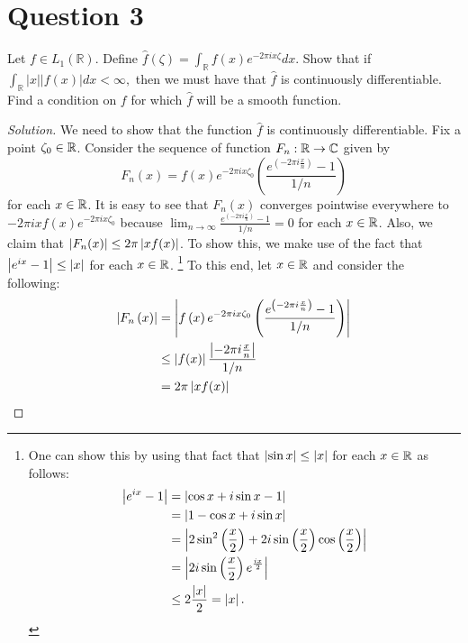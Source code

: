 \section{Question 3}
\horz
Let $f\in L_1(\mathbb R).$ Define $\hat{f}(\zeta)=\int_{\mathbb R}f(x)e^{-2\pi ix\zeta}dx.$ Show that if $\int_{\mathbb{R}}|x||f(x)|dx<\infty,$ then we must have that $\hat{f}$ is continuously differentiable. Find a condition on $f$ for which $\hat{f}$ will be a smooth function.
\horz
\begin{proof}[Solution]
We need to show that the function $\hat{f}$ is continuously differentiable. Fix a point $\zeta_{0} \in \mathbb R$. Consider the sequence of function $F_n : \mathbb R \to \mathbb C$ given by
\begin{equation*}
F_{n} \left( x \right) = f\left( x \right)e^{-2\pi i x \zeta_{0}}\left( \frac{e^{\left( -2\pi i \frac{x}{n} \right)} - 1}{1/n} \right)
\end{equation*}
for each $x \in \mathbb R$.
It is easy to see that $F_{n} \left( x \right)$ converges pointwise everywhere to $-2\pi i x f(x)e^{-2\pi i x \zeta_{0}}$ because $\lim_{n\to \infty} \frac{e^{\left( -2\pi i \frac{x}{n} \right)} - 1}{1/n} = 0$ for each  $x \in \mathbb R$. 
Also, we claim that $\left\lvert F_n (x) \right\rvert \le 2\pi \left\lvert x f(x) \right\rvert$. To show this, we make use of the fact that $\left\lvert e^{ix} -1  \right\rvert \le \left\lvert x \right\rvert$ for each $x\in \mathbb R$. \footnote{One can show this by using that fact that $\left\lvert \sin x \right\rvert\le \left\lvert x \right\rvert$ for each  $x\in \mathbb R$ as follows:
\begin{align*}
\left\lvert e^{ix} - 1 \right\rvert &= \left\lvert \cos x + i \sin x -1 \right\rvert \\
&= \left\lvert 1- \cos x + i \sin x \right\rvert \\
&= \left\lvert 2 \sin ^{2} \left( \frac{x}{2} \right) + 2i \sin \left( \frac{x}{2} \right) \cos \left( \frac{x}{2} \right) \right\rvert \\
&= \left\lvert 2i \sin \left( \frac{x}{2} \right) e^{\frac{ix}{2}} \right\rvert \\
&\le 2 \frac{\left\lvert x \right\rvert}{2} = \left\lvert x \right\rvert.
\end{align*}}
To this end, let $x\in \mathbb R$ and consider the following:
\begin{align*}
\left\lvert F_{n}\left( x \right) \right\rvert &= \left\lvert f\left( x \right)e^{-2\pi i x \zeta_{0}}\left( \frac{e^{\left( -2\pi i \frac{x}{n} \right)} - 1}{1/n} \right) \right\rvert \\
&\le \left\lvert f(x) \right\rvert \frac{\left\lvert -2\pi i \frac{x}{n} \right\rvert}{1/n} \\
&= 2\pi \left\lvert xf(x) \right\rvert 
\end{align*}


\end{proof}
